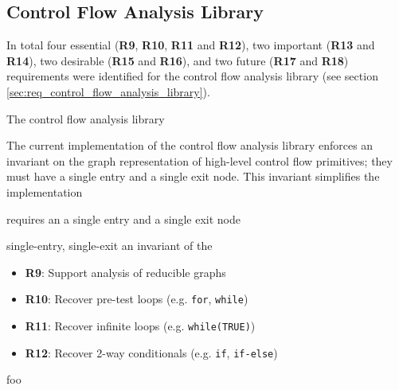 
\subsection{Control Flow Analysis Library}
\label{sec:eval_control_flow_analysis_library}

In total four essential (\textbf{R9}, \textbf{R10}, \textbf{R11} and \textbf{R12}), two important (\textbf{R13} and \textbf{R14}), two desirable (\textbf{R15} and \textbf{R16}), and two future (\textbf{R17} and \textbf{R18}) requirements were identified for the control flow analysis library (see section \ref{sec:req_control_flow_analysis_library}).

The control flow analysis library


The current implementation of the control flow analysis library enforces an invariant on the graph representation of high-level control flow primitives; they must have a single entry and a single exit node. This invariant simplifies the implementation

requires an a single entry and a single exit node

 single-entry, single-exit an invariant of the

\begin{itemize}
	\item \textbf{R9}: Support analysis of reducible graphs
	\item \textbf{R10}: Recover pre-test loops (e.g. \texttt{for}, \texttt{while})
	\item \textbf{R11}: Recover infinite loops (e.g. \texttt{while(TRUE)})
	\item \textbf{R12}: Recover 2-way conditionals (e.g. \texttt{if}, \texttt{if-else})
\end{itemize}

foo
